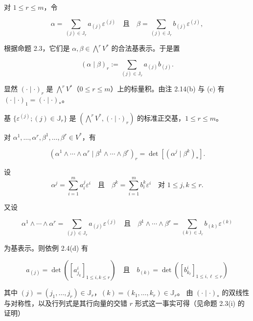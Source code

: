 对 $ 1 \le r \le m $，令

\[
\alpha = \sum_{(j)\in\mathbb{J}_r} a_{(j)}\varepsilon^{(j)} \quad \text{且} \quad \beta = \sum_{(j)\in\mathbb{J}_r} b_{(j)}\varepsilon^{(j)},
\]

根据命题 2.3，它们是 $ \alpha, \beta \in \bigwedge^{r}V^{*} $ 的合法基表示。于是置

\begin{equation}
(\alpha \mid \beta)_r := \sum_{(j)\in\mathbb{J}_r} a_{(j)}b_{(j)}.\tag{2.15}
\end{equation}

显然 $ (\cdot \mid \cdot)_r $ 是 $ \bigwedge^{r}V^{*} $（$ 0 \le r \le m $）上的标量积。由注 2.14(b) 与 (c) 有 $ (\cdot \mid \cdot)_1 = (\cdot \mid \cdot)_{\ast} $。

\begin{remark}

\begin{items}
\item

基 $ \{\varepsilon^{(j)}; (j) \in \mathbb{J}_r\} $ 是 $ (\bigwedge^{r}V^{*}, (\cdot \mid \cdot)_r) $ 的标准正交基，$ 1 \le r \le m $。

\item

对 $ \alpha^1,\ldots,\alpha^r, \beta^1,\ldots,\beta^r \in V^{*} $，有

\[
(\alpha^1 \wedge \cdots \wedge \alpha^r \mid \beta^1 \wedge \cdots \wedge \beta^r)_r = \det[(\alpha^{j} \mid \beta^{k})_{\ast}].
\]

\proofhead
设
\[
\alpha^{j} = \sum_{i=1}^{m} a^{j}_{i}\varepsilon^{i} \quad \text{且} \quad \beta^{k} = \sum_{i=1}^{m} b^{k}_{i}\varepsilon^{i} \quad \text{对 } 1 \le j, k \le r.
\]

又设

\[
\alpha^1 \wedge \cdots \wedge \alpha^r = \sum_{(j)\in\mathbb{J}_r} a_{(j)}\varepsilon^{(j)} \quad \text{且} \quad \beta^1 \wedge \cdots \wedge \beta^r = \sum_{(k)\in\mathbb{J}_r} b_{(k)}\varepsilon^{(k)}
\]

为基表示。则依例 2.4(d) 有

\[
a_{(j)} = \det\left(\left[a^{i}_{j_k}\right]_{1\le i,k\le r}\right) \quad \text{且} \quad b_{(k)} = \det\left(\left[b^{i}_{k_\ell}\right]_{1\le i,\ell\le r}\right)
\]

其中 $ (j) = (j_1,\ldots,j_r) \in \mathbb{J}_r $，$ (k) = (k_1,\ldots,k_r) \in \mathbb{J}_r $。
由 $ (\cdot \mid \cdot)_{\ast} $ 的双线性与对称性，以及行列式是其行向量的交错 $ r $ 形式这一事实可得（见命题 2.3(i) 的证明）


\end{items}
\end{remark}
